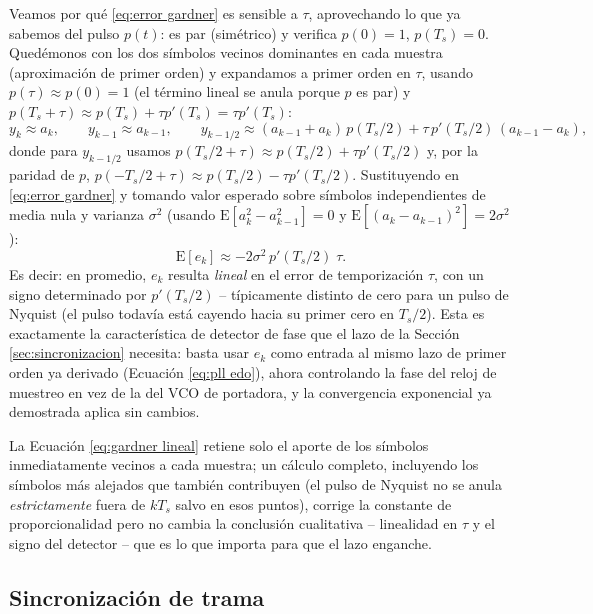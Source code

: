 Veamos por qué \eqref{eq:error gardner} es sensible a $\tau$, aprovechando lo que ya sabemos del pulso $p(t)$: es par (simétrico) y verifica $p(0)=1$, $p(T_s)=0$. Quedémonos con los dos símbolos vecinos dominantes en cada muestra (aproximación de primer orden) y expandamos a primer orden en $\tau$, usando $p(\tau)\approx p(0)=1$ (el término lineal se anula porque $p$ es par) y $p(T_s+\tau)\approx p(T_s)+\tau p'(T_s) = \tau p'(T_s)$:
\begin{equation*}
    y_k \approx a_k,\qquad y_{k-1}\approx a_{k-1}, \qquad y_{k-1/2}\approx (a_{k-1}+a_k)\,p(T_s/2) + \tau\, p'(T_s/2)\,(a_{k-1}-a_k),
\end{equation*}
donde para $y_{k-1/2}$ usamos $p(T_s/2+\tau)\approx p(T_s/2)+\tau p'(T_s/2)$ y, por la paridad de $p$, $p(-T_s/2+\tau)\approx p(T_s/2)-\tau p'(T_s/2)$. Sustituyendo en \eqref{eq:error gardner} y tomando valor esperado sobre símbolos independientes de media nula y varianza $\sigma^2$ (usando $\mathrm E[a_k^2-a_{k-1}^2]=0$ y $\mathrm E[(a_k-a_{k-1})^2]=2\sigma^2$):
\begin{equation}\label{eq:gardner lineal}
    \mathrm E[e_k] \approx -2\sigma^2\, p'(T_s/2)\;\tau.
\end{equation}
Es decir: en promedio, $e_k$ resulta \emph{lineal} en el error de temporización $\tau$, con un signo determinado por $p'(T_s/2)$ -- típicamente distinto de cero para un pulso de Nyquist (el pulso todavía está cayendo hacia su primer cero en $T_s/2$). Esta es exactamente la característica de detector de fase que el lazo de la Sección \ref{sec:sincronizacion} necesita: basta usar $e_k$ como entrada al mismo lazo de primer orden ya derivado (Ecuación \eqref{eq:pll edo}), ahora controlando la fase del reloj de muestreo en vez de la del VCO de portadora, y la convergencia exponencial ya demostrada aplica sin cambios.

\begin{remark}
La Ecuación \eqref{eq:gardner lineal} retiene solo el aporte de los símbolos inmediatamente vecinos a cada muestra; un cálculo completo, incluyendo los símbolos más alejados que también contribuyen (el pulso de Nyquist no se anula \emph{estrictamente} fuera de $kT_s$ salvo en esos puntos), corrige la constante de proporcionalidad pero no cambia la conclusión cualitativa -- linealidad en $\tau$ y el signo del detector -- que es lo que importa para que el lazo enganche.
\end{remark}

\subsection*{Sincronización de trama}\label{sec:sincronizacion trama}

